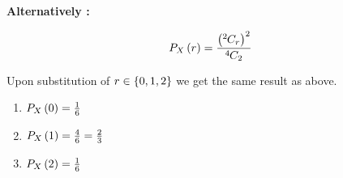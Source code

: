 \documentclass[journal,12pt,twocolumn]{IEEEtran}
\begin{document}
	
	\textbf{Alternatively :}
	
	
	\begin{align}
		P_{X}\left(r\right) = \frac{\left({{}^{2}\mkern-1muC_{r}}\right)^2}{{{}^{4}\mkern-1muC_{2}}}
			\label{comb_form}
	\end{align}
	
	Upon substitution of $r \in \left\{0, 1, 2\right\}$ we get the same result as above.
	
	\begin{enumerate}[label = \brak{\textbf{\roman*}}]

		\item $P_{X}\left(0\right) = \frac{1}{6}$
	
		\item $P_{X}\left(1\right) = \frac{4}{6} = \frac{2}{3}$
	
		\item $P_{X}\left(2\right) = \frac{1}{6}$
	
	\end{enumerate}

	
\end{document}
